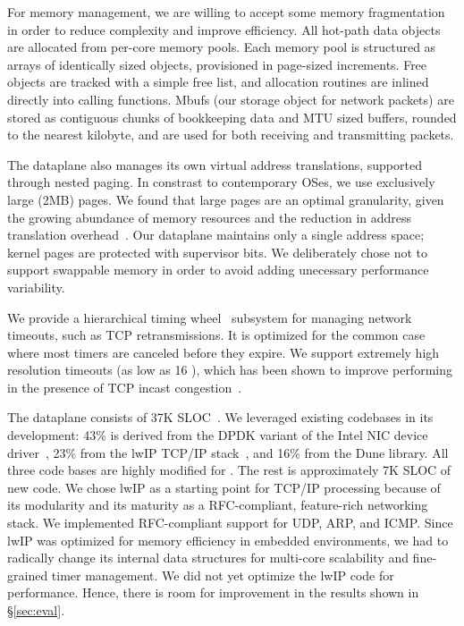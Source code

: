 For memory management, we are willing to accept some memory fragmentation in order
to reduce complexity and improve efficiency. All hot-path data objects are allocated from
per-core memory pools. Each memory pool is structured as arrays
of identically sized objects, provisioned in page-sized increments. Free objects
are tracked with a simple free list, and allocation routines are
inlined directly into calling functions. Mbufs (our storage object
for network packets) are stored as contiguous chunks of bookkeeping
data and MTU sized buffers, rounded to the nearest
kilobyte, and are used for both receiving and transmitting packets.

The dataplane also manages its own virtual address translations, supported
through nested paging. In constrast to contemporary OSes, we use exclusively
large (2MB) pages. We found that large pages are an optimal granularity,
given the growing abundance of memory resources and the reduction in address
translation overhead~\cite{DBLP:conf/isca/BasuGCHS13, dune}. Our dataplane maintains
only a single address space; kernel pages are protected with
supervisor bits. We deliberately chose not to support swappable memory
in order to avoid adding unecessary performance variability.

We provide a hierarchical timing wheel~\cite{DBLP:conf/sosp/VargheseL87} subsystem
for managing network timeouts, such as TCP retransmissions. It is optimized
for the common case where most timers are canceled before they expire. We support
extremely high resolution timeouts (as low as 16 \microsecond), which has been
shown to improve performing in the presence of TCP incast congestion~\cite{DBLP:conf/sigcomm/VasudevanPSKAGGM09}.

The dataplane consists of  37K SLOC~\cite{url:sloccount}.  We
leveraged existing codebases in its development: 43\% is derived from
the DPDK variant of the Intel NIC device driver~\cite{intel:dpdk},
23\% from the lwIP TCP/IP stack~\cite{dunkels2001design}, and 16\%
from the Dune library.  All three code bases are highly modified for
\ix. The rest is approximately 7K SLOC of new code. We chose lwIP as a
starting point for TCP/IP processing because of its modularity and its
maturity as a RFC-compliant, feature-rich networking stack. We
implemented RFC-compliant support for UDP, ARP, and ICMP.
Since lwIP was optimized for memory efficiency in embedded
environments, we had to radically change its internal data structures
for multi-core scalability and fine-grained timer management. We did not
yet optimize the lwIP code for performance. Hence, there is room for
improvement in the results shown in \S\ref{sec:eval}.

